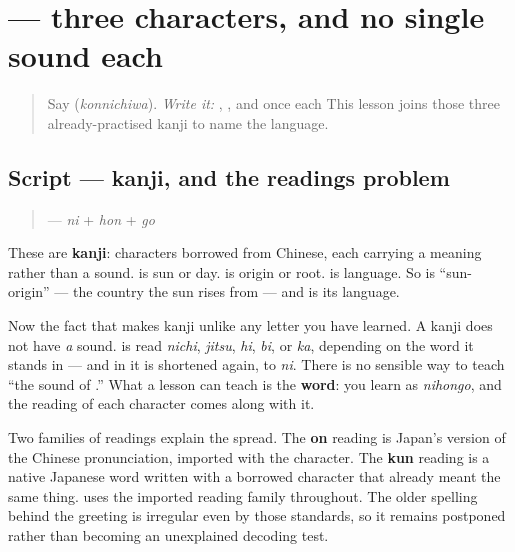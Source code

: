 \section[\texorpdfstring{\ja{日本語} (nihongo)}{日本語 (nihongo)}]{ — three characters, and no single sound each}

\label{lesson:JA-C01-nihongo}



\begin{quote}
Say \textbf{} (\emph{konnichiwa}). \emph{Write it:} , , and  once each This lesson joins those three already-practised kanji to name the language.
\end{quote}

\subsection*{Script — kanji, and the readings problem}
\begin{quote}
\textbf{} — \emph{ni} + \emph{hon} + \emph{go}
\end{quote}

These are \textbf{kanji}: characters borrowed from Chinese, each carrying a meaning rather than a sound.  is sun or day.  is origin or root.  is language. So  is \textquotedblleft{}sun-origin\textquotedblright{} — the country the sun rises from — and  is its language.

Now the fact that makes kanji unlike any letter you have learned. A kanji does not have \emph{a} sound.  is read \emph{nichi}, \emph{jitsu}, \emph{hi}, \emph{bi}, or \emph{ka}, depending on the word it stands in — and in  it is shortened again, to \emph{ni}. There is no sensible way to teach \textquotedblleft{}the sound of .\textquotedblright{} What a lesson can teach is the \textbf{word}: you learn  as \emph{nihongo}, and the reading of each character comes along with it.

Two families of readings explain the spread. The \textbf{on} reading is Japan's version of the Chinese pronunciation, imported with the character. The \textbf{kun} reading is a native Japanese word written with a borrowed character that already meant the same thing.  uses the imported reading family throughout. The older spelling behind the greeting is irregular even by those standards, so it remains postponed rather than becoming an unexplained decoding test.

